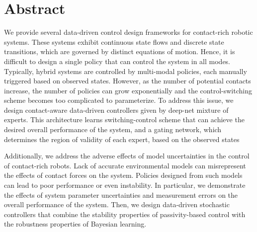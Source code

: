 \chapter*{Abstract}

We provide several data-driven control design frameworks for contact-rich
robotic systems.
%
These systems exhibit continuous state flows and discrete state transitions,
which are governed by distinct equations of motion.
%
Hence, it is difficult to design a single policy that can control the system in
all modes.
%
Typically, hybrid systems are controlled by multi-modal policies, each manually
triggered based on observed states.
%
However, as the number of potential contacts increase, the number of policies
can grow exponentially and the control-switching scheme becomes too complicated
to parameterize.
%
To address this issue, we design contact-aware data-driven controllers given by
deep-net mixture of experts.
%
This architecture learns switching-control scheme that can achieve the
desired overall performance of the system, and a gating network, which
determines the region of validity of each expert, based on the observed states
%


Additionally, we address the adverse effects of model uncertainties in the
control of contact-rich robots.
%
Lack of accurate environmental models can misrepresent the effects of contact
forces on the system.
%
Policies designed from such models can lead to poor performance or even
instability.
%
In particular, we demonstrate the effects of system parameter uncertainties and 
measurement errors on the overall performance of the system.
%
Then, we design data-driven stochastic controllers that combine the stability
properties of passivity-based control with the robustness properties of Bayesian
learning.
%


